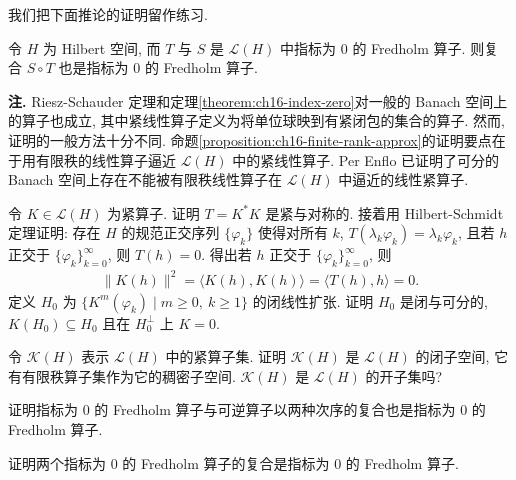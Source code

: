 \documentclass[../../main.tex]{subfiles}
\begin{document}
我们把下面推论的证明留作练习.

\begin{corollary}\label{corollary:ch16-fredholm-composition}
令 $H$ 为 Hilbert 空间, 而 $T$ 与 $S$ 是 $\mathcal{L}(H)$ 中指标为 $0$ 的 Fredholm 算子. 则复合 $S\circ T$ 也是指标为 $0$ 的 Fredholm 算子.
\end{corollary}

\medskip\par\noindent\textbf{注. }Riesz-Schauder 定理和定理\cref{theorem:ch16-index-zero}对一般的 Banach 空间上的算子也成立, 其中紧线性算子定义为将单位球映到有紧闭包的集合的算子. 然而, 证明的一般方法十分不同. 命题\cref{proposition:ch16-finite-rank-approx}的证明要点在于用有限秩的线性算子逼近 $\mathcal{L}(H)$ 中的紧线性算子. Per Enflo 已证明了可分的 Banach 空间上存在不能被有限秩线性算子在 $\mathcal{L}(H)$ 中逼近的线性紧算子.

\begin{exercise}\label{exercise:ch16-53}
令 $K\in\mathcal{L}(H)$ 为紧算子. 证明 $T=K^{*}K$ 是紧与对称的. 接着用 Hilbert-Schmidt 定理证明: 存在 $H$ 的规范正交序列 $\{\varphi_{k}\}$ 使得对所有 $k$, $T(\lambda_{k}\varphi_{k})=\lambda_{k}\varphi_{k}$, 且若 $h$ 正交于 $\{\varphi_{k}\}_{k=0}^{\infty}$, 则 $T(h)=0$. 得出若 $h$ 正交于 $\{\varphi_{k}\}_{k=0}^{\infty}$, 则
\begin{align*}
\|K(h)\|^{2}=\langle K(h),K(h)\rangle=\langle T(h),h\rangle=0.
\end{align*}
定义 $H_{0}$ 为 $\{K^{m}(\varphi_{k})\mid m\geqslant 0,\ k\geqslant 1\}$ 的闭线性扩张. 证明 $H_{0}$ 是闭与可分的, $K(H_{0})\subseteq H_{0}$ 且在 $H_{0}^{\perp}$ 上 $K=0$.
\end{exercise}

\begin{exercise}\label{exercise:ch16-54}
令 $\mathcal{K}(H)$ 表示 $\mathcal{L}(H)$ 中的紧算子集. 证明 $\mathcal{K}(H)$ 是 $\mathcal{L}(H)$ 的闭子空间, 它有有限秩算子集作为它的稠密子空间. $\mathcal{K}(H)$ 是 $\mathcal{L}(H)$ 的开子集吗?
\end{exercise}

\begin{exercise}\label{exercise:ch16-55}
证明指标为 $0$ 的 Fredholm 算子与可逆算子以两种次序的复合也是指标为 $0$ 的 Fredholm 算子.
\end{exercise}

\begin{exercise}\label{exercise:ch16-56}
证明两个指标为 $0$ 的 Fredholm 算子的复合是指标为 $0$ 的 Fredholm 算子.
\end{exercise}
\end{document}
